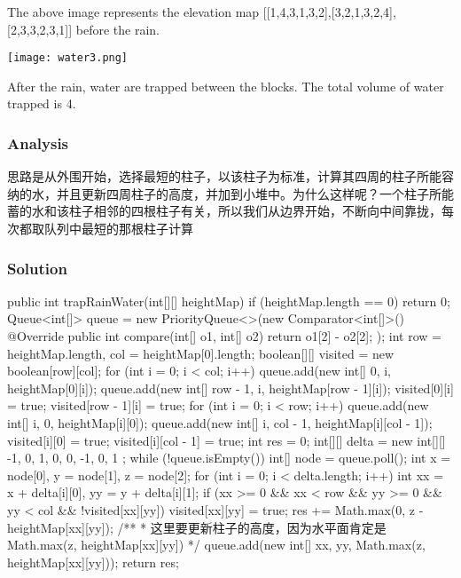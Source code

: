 The above image represents the elevation map [[1,4,3,1,3,2],[3,2,1,3,2,4],[2,3,3,2,3,1]] before the rain.

\begin{center}
\texttt{[image: water3.png]}\\
\end{center}

After the rain, water are trapped between the blocks. The total volume of water trapped is 4.

\subsubsection{Analysis}
思路是从外围开始，选择最短的柱子，以该柱子为标准，计算其四周的柱子所能容纳的水，并且更新四周柱子的高度，并加到小堆中。为什么这样呢？一个柱子所能蓄的水和该柱子相邻的四根柱子有关，所以我们从边界开始，不断向中间靠拢，每次都取队列中最短的那根柱子计算

\newpage

\subsubsection{Solution}

\begin{Code}
public int trapRainWater(int[][] heightMap) {
    if (heightMap.length == 0) {
        return 0;
    }
    Queue<int[]> queue = new PriorityQueue<>(new Comparator<int[]>() {
        @Override
        public int compare(int[] o1, int[] o2) {
            return o1[2] - o2[2];
        }
    });
    int row = heightMap.length, col = heightMap[0].length;
    boolean[][] visited = new boolean[row][col];
    for (int i = 0; i < col; i++) {
        queue.add(new int[] {0, i, heightMap[0][i]});
        queue.add(new int[] {row - 1, i, heightMap[row - 1][i]});
        visited[0][i] = true;
        visited[row - 1][i] = true;
    }
    for (int i = 0; i < row; i++) {
        queue.add(new int[] {i, 0, heightMap[i][0]});
        queue.add(new int[] {i, col - 1, heightMap[i][col - 1]});
        visited[i][0] = true;
        visited[i][col - 1] = true;
    }
    int res = 0;
    int[][] delta = new int[][] {
            {-1, 0}, {1, 0}, {0, -1}, {0, 1}
    };
    while (!queue.isEmpty()) {
        int[] node = queue.poll();
        int x = node[0], y = node[1], z = node[2];
        for (int i = 0; i < delta.length; i++) {
            int xx = x + delta[i][0], yy = y + delta[i][1];
            if (xx >= 0 && xx < row && yy >= 0 && yy < col && !visited[xx][yy]) {
                visited[xx][yy] = true;
                res += Math.max(0, z - heightMap[xx][yy]);
                /**
                 * 这里要更新柱子的高度，因为水平面肯定是Math.max(z, heightMap[xx][yy])
                 */
                queue.add(new int[] {xx, yy, Math.max(z, heightMap[xx][yy])});
            }
        }
    }
    return res;
}
\end{Code}

